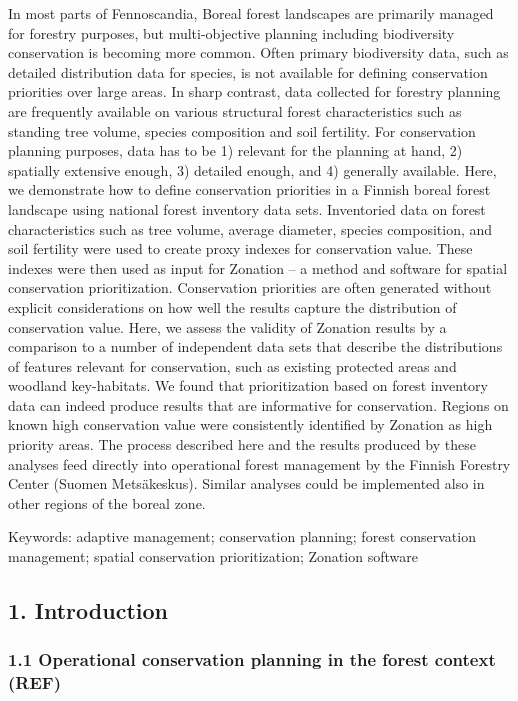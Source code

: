 \documentclass[]{article}
\begin{document}
In most parts of Fennoscandia, Boreal forest landscapes are primarily
managed for forestry purposes, but multi-objective planning including
biodiversity conservation is becoming more common. Often primary
biodiversity data, such as detailed distribution data for species, is
not available for defining conservation priorities over large areas. In
sharp contrast, data collected for forestry planning are frequently
available on various structural forest characteristics such as standing
tree volume, species composition and soil fertility. For conservation
planning purposes, data has to be 1) relevant for the planning at hand,
2) spatially extensive enough, 3) detailed enough, and 4) generally
available. Here, we demonstrate how to define conservation priorities in
a Finnish boreal forest landscape using national forest inventory data
sets. Inventoried data on forest characteristics such as tree volume,
average diameter, species composition, and soil fertility were used to
create proxy indexes for conservation value. These indexes were then
used as input for Zonation -- a method and software for spatial
conservation prioritization. Conservation priorities are often generated
without explicit considerations on how well the results capture the
distribution of conservation value. Here, we assess the validity of
Zonation results by a comparison to a number of independent data sets
that describe the distributions of features relevant for conservation,
such as existing protected areas and woodland key-habitats. We found
that prioritization based on forest inventory data can indeed produce
results that are informative for conservation. Regions on known high
conservation value were consistently identified by Zonation as high
priority areas. The process described here and the results produced by
these analyses feed directly into operational forest management by the
Finnish Forestry Center (Suomen Metsäkeskus). Similar analyses could be
implemented also in other regions of the boreal zone.

Keywords: adaptive management; conservation planning; forest
conservation management; spatial conservation prioritization; Zonation
software

\subsection{1. Introduction}

\subsubsection{1.1 Operational conservation planning in the forest
context (REF)}
\end{document}
